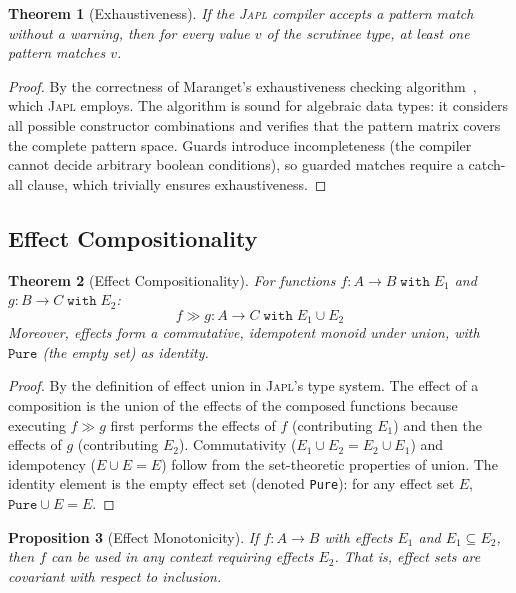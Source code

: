 \documentclass[11pt,a4paper]{article}
\newtheorem{theorem}{Theorem}[section]
\newtheorem{proposition}[theorem]{Proposition}
\newcommand{\japl}{\textsc{Japl}}
\begin{document}
\begin{theorem}[Exhaustiveness]
\label{thm:exhaustiveness}
If the \japl{} compiler accepts a pattern match without a warning, then for every value $v$ of the scrutinee type, at least one pattern matches $v$.
\end{theorem}

\begin{proof}
By the correctness of Maranget's exhaustiveness checking algorithm~\citep{maranget2008compiling}, which \japl{} employs. The algorithm is sound for algebraic data types: it considers all possible constructor combinations and verifies that the pattern matrix covers the complete pattern space. Guards introduce incompleteness (the compiler cannot decide arbitrary boolean conditions), so guarded matches require a catch-all clause, which trivially ensures exhaustiveness.
\end{proof}

\subsection{Effect Compositionality}

\begin{theorem}[Effect Compositionality]
\label{thm:effect-compositionality}
For functions $f : A \to B \;\texttt{with}\; E_1$ and $g : B \to C \;\texttt{with}\; E_2$:
\[
f \gg g : A \to C \;\texttt{with}\; E_1 \cup E_2
\]
Moreover, effects form a commutative, idempotent monoid under union, with $\texttt{Pure}$ (the empty set) as identity.
\end{theorem}

\begin{proof}
By the definition of effect union in \japl{}'s type system. The effect of a composition is the union of the effects of the composed functions because executing $f \gg g$ first performs the effects of $f$ (contributing $E_1$) and then the effects of $g$ (contributing $E_2$). Commutativity ($E_1 \cup E_2 = E_2 \cup E_1$) and idempotency ($E \cup E = E$) follow from the set-theoretic properties of union. The identity element is the empty effect set (denoted \texttt{Pure}): for any effect set $E$, $\texttt{Pure} \cup E = E$.
\end{proof}

\begin{proposition}[Effect Monotonicity]
If $f : A \to B$ with effects $E_1$ and $E_1 \subseteq E_2$, then $f$ can be used in any context requiring effects $E_2$. That is, effect sets are covariant with respect to inclusion.
\end{proposition}
\end{document}

